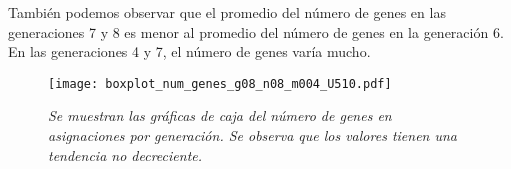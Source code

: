 También podemos observar que el promedio del número de genes en las generaciones 7 y 8 es menor al promedio del número de genes en la generación 6. En las generaciones 4 y 7, el número de genes varía mucho.

\begin{figure}[h]
\centering
\texttt{[image: boxplot\_num\_genes\_g08\_n08\_m004\_U510.pdf]} %
\caption[\textit{Gráficas de caja del número de genes en asignaciones por generación}]{\textit{Se muestran las gráficas de caja del número de genes en asignaciones por generación. Se observa que los valores tienen una tendencia no decreciente.}}\label{boxplot_num_genes_x_generacion}
\end{figure}


%


